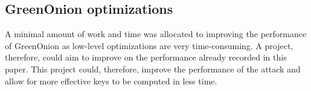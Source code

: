 \subsection*{GreenOnion optimizations}
A minimal amount of work and time was allocated to improving the performance of GreenOnion as low-level optimizations are very time-consuming. A project, therefore, could aim to improve on the performance already recorded in this paper. This project could, therefore, improve the performance of the attack and allow for more effective keys to be computed in less time. 